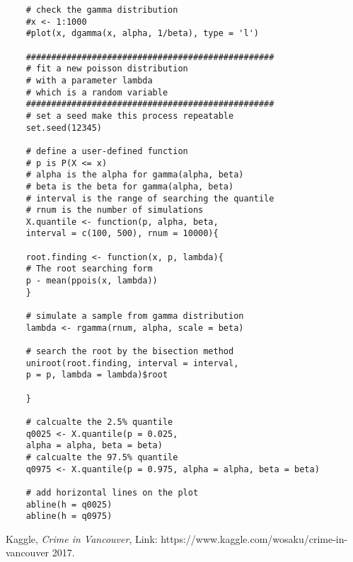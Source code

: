 \documentclass[12pt]{article}
\begin{document}
\begin{enumerate}
\begin{verbatim}
	# check the gamma distribution
	#x <- 1:1000 
	#plot(x, dgamma(x, alpha, 1/beta), type = 'l')
	
	#################################################
	# fit a new poisson distribution 
	# with a parameter lambda 
	# which is a random variable
	#################################################
	# set a seed make this process repeatable
	set.seed(12345)
	
	# define a user-defined function
	# p is P(X <= x)
	# alpha is the alpha for gamma(alpha, beta)
	# beta is the beta for gamma(alpha, beta)
	# interval is the range of searching the quantile
	# rnum is the number of simulations
	X.quantile <- function(p, alpha, beta, 
	interval = c(100, 500), rnum = 10000){
	
	root.finding <- function(x, p, lambda){
	# The root searching form
	p - mean(ppois(x, lambda))
	}
	
	# simulate a sample from gamma distribution
	lambda <- rgamma(rnum, alpha, scale = beta)
	
	# search the root by the bisection method
	uniroot(root.finding, interval = interval, 
	p = p, lambda = lambda)$root
	
	}
	
	# calcualte the 2.5% quantile
	q0025 <- X.quantile(p = 0.025, 
	alpha = alpha, beta = beta)
	# calcualte the 97.5% quantile
	q0975 <- X.quantile(p = 0.975, alpha = alpha, beta = beta)
	
	# add horizontal lines on the plot
	abline(h = q0025)
	abline(h = q0975)
	\end{verbatim}
\end{enumerate}



%

\begin{thebibliography}{9}
	
	Kaggle,
	\textit{Crime in Vancouver},
	Link: https://www.kaggle.com/wosaku/crime-in-vancouver
	2017.
	
\end{thebibliography}
\end{document}
